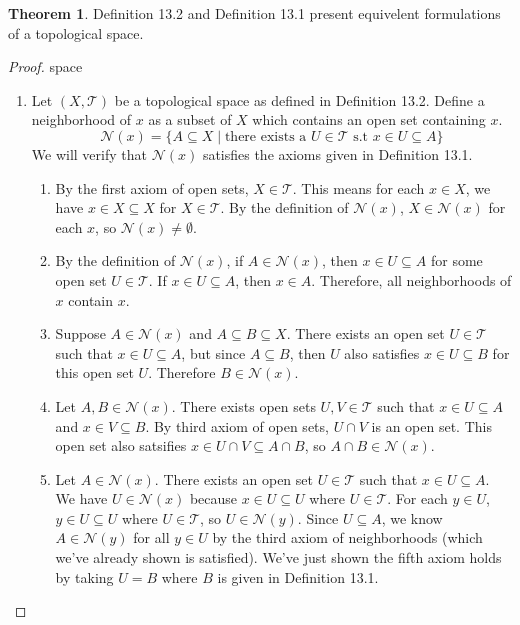 \documentclass{article}
\newcommand{\T}{\mathcal{T}}
\theoremstyle{definition}
\newtheorem{theorem}{Theorem}[section]
\begin{document}
		 
	\begin{theorem}
		Definition 13.2 and Definition 13.1 present equivelent formulations of a topological space.
	\end{theorem}
	\begin{proof}{\color{white}space}
		\begin{enumerate}
			\item [$ (\Longrightarrow) $] Let $(X,\T)$ be a topological space as defined in Definition 13.2. Define a neighborhood of $x$ as a subset of $X$ which contains an open set containing $x$. 
			$$ \mathcal N(x) = \{A \subseteq X\mid\text{there exists a }U\in\T \text{ s.t }x\in U\subseteq A\}$$
			We will verify that $\mathcal N(x)$ satisfies the axioms given in Definition 13.1.
			\begin{enumerate}
				\item [1.] By the first axiom of open sets, $X\in\T$. This means for each $x\in X$, we have $x\in X\subseteq X$ for $X\in\T$. By the definition of $\mathcal N(x)$, $X\in\mathcal N(x)$ for each $x$, so $\mathcal N(x)\neq\emptyset$.
				\item [2.] By the definition of $\mathcal N(x)$, if $A\in \mathcal N(x)$, then $x\in U\subseteq A $ for some open set $U\in \T$. If $x\in U\subseteq A$, then $x\in A$. Therefore, all neighborhoods of $x$ contain $x$.
				\item [3.] Suppose $A\in \mathcal N(x)$ and $A\subseteq B\subseteq X$. There exists an open set $U\in\T$ such that $x\in U\subseteq A$, but since $A\subseteq B$, then $U$ also satisfies $x\in U\subseteq B$ for this open set $U$. Therefore $B\in\mathcal N(x)$.
				\item [4.] Let $A,B\in \mathcal N(x)$. There exists open sets $U,V\in\T$ such that $x\in U\subseteq A$ and $x\in V\subseteq B$. By third axiom of open sets, $U\cap V$ is an open set. This open set also satsifies $x\in U\cap V\subseteq A\cap B$, so $A\cap B\in \mathcal N(x)$.
				\item [5.] Let $A\in \mathcal N(x)$. There exists an open set $U\in\T$ such that $x\in U\subseteq A$. We have $U\in\mathcal N(x)$ because $x\in U\subseteq U$ where $U\in \T$. For each $y\in U$, $y\in U\subseteq U$ where $U\in\T$, so $U\in \mathcal N(y)$. Since $U\subseteq A$, we know $A\in \mathcal N(y)$ for all $y\in U$ by the third axiom of neighborhoods (which we've already shown is satisfied). We've just shown the fifth axiom holds by taking $U=B$ where $B$ is given in Definition 13.1. 
			\end{enumerate}
			

\end{enumerate}
\end{proof}
\end{document}
